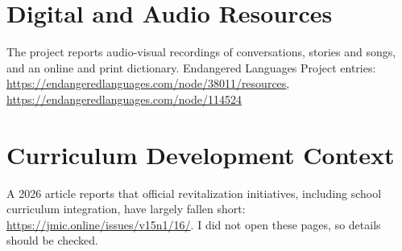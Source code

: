 \documentclass[12pt]{article}
\begin{document}
\section{Digital and Audio Resources}
The project reports audio-visual recordings of conversations, stories and songs, and an online and print dictionary. Endangered Languages Project entries: \url{https://endangeredlanguages.com/node/38011/resources}, \url{https://endangeredlanguages.com/node/114524}
\section{Curriculum Development Context}
A 2026 article reports that official revitalization initiatives, including school curriculum integration, have largely fallen short: \url{https://jmic.online/issues/v15n1/16/}. I did not open these pages, so details should be checked.
\end{document}
